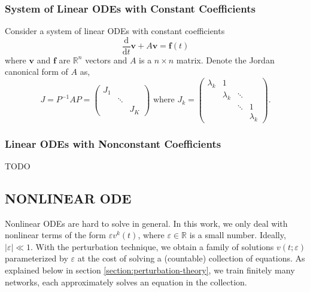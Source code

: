 \documentclass[accepted]{uai2023}
\newcommand{\vect}[1]{\mathbf{#1}}
\begin{document}
\subsubsection{System of Linear ODEs with Constant Coefficients} \label{section:system-of-linear-odes-with-constant-coefficients}
    Consider a system of linear ODEs with constant coefficients 
    {
        \small
        \vspace{-0.25em}
        \begin{equation}\label{eq:linear-system-master}
            \frac{\mathrm{d}}{\mathrm{d}t}\vect{v} + A\vect{v} = \vect{f}(t)
        \end{equation}
    }
    where $\vect{v}$ and $\vect{f}$ are $\mathbb{R}^n$ vectors and $A$ is a $n\times n$ matrix. Denote the Jordan canonical form of $A$ as,
    {
        \smaller
        \begingroup 
        \setlength\arraycolsep{1pt}
        \begin{equation}\label{eq:jordan-definition}
            J = P^{-1}AP= \begin{pmatrix}
                J_1 & & \\[-0.25em]
                & \ddots & \\[-0.25em]
                & & J_K
            \end{pmatrix}
            {\text{ where }}
            J_k = \begin{pmatrix}
                \lambda_k & 1\\[-0.75em]
                & \lambda_k & \ddots\\[-0.75em]
                & & \ddots & 1\\[-0.25em]
                & & & \lambda_k
            \end{pmatrix}.
        \end{equation}
        \endgroup
    }

\subsubsection{Linear ODEs with Nonconstant Coefficients}
    TODO

\subsection{NONLINEAR ODE}
    Nonlinear ODEs are hard to solve in general. 
    In this work, we only deal with nonlinear terms of the form $\varepsilon v^k(t)$, where $\varepsilon \in \mathbb{R}$ is a small number. 
    Ideally, $|\varepsilon| \ll 1$. 
    With the perturbation technique, we obtain a family of solutions $v(t;\varepsilon)$ parameterized by $\varepsilon$ at the cost of solving a (countable) collection of equations. 
    As explained below in section \ref{section:perturbation-theory}, we train finitely many networks, each approximately solves an equation in the collection.
\end{document}

